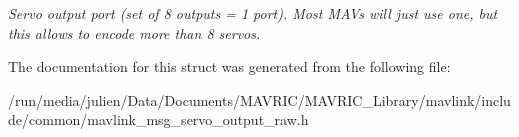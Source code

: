 \begin{DoxyCompactItemize}
\begin{DoxyCompactList}\small\item\em Servo output port (set of 8 outputs = 1 port). Most M\+A\+Vs will just use one, but this allows to encode more than 8 servos. \end{DoxyCompactList}\end{DoxyCompactItemize}


The documentation for this struct was generated from the following file\+:\begin{DoxyCompactItemize}
\item 
/run/media/julien/\+Data/\+Documents/\+M\+A\+V\+R\+I\+C/\+M\+A\+V\+R\+I\+C\+\_\+\+Library/mavlink/include/common/mavlink\+\_\+msg\+\_\+servo\+\_\+output\+\_\+raw.\+h\end{DoxyCompactItemize}
